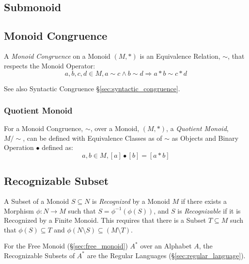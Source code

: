 \subsection{Submonoid}\label{sec:submonoid}

\subsection{Monoid Congruence}\label{sec:monoid_congruence}

A \emph{Monoid Congruence} on a Monoid $(M,*)$ is an Equivalence
Relation, $\sim$, that respects the Monoid Operator:
\[
  a,b,c,d \in M, a \sim c \wedge b \sim d \Rightarrow a*b \sim c*d
\]

See also Syntactic Congruence \S\ref{sec:syntactic_congruence}.



\subsubsection{Quotient Monoid}\label{sec:quotient_monoid}

For a Monoid Congruence, $\sim$, over a Monoid, $(M,*)$, a
\emph{Quotient Monoid}, $M/\sim$, can be defined with Equivalence
Classes as of $\sim$ as Objects and Binary Operation $\bullet$ defined
as:
\[
  a,b \in M, [a]\bullet[b] = [a*b]
\]



\subsection{Recognizable Subset}\label{sec:recognizable}

A Subset of a Monoid $S \subseteq N$ is \emph{Recognized} by a Monoid
$M$ if there exists a Morphism $\phi : N \rightarrow M$ such that $S =
\phi^{-1}(\phi(S))$, and $S$ is \emph{Recognizable} if it is
Recognized by a Finite Monoid. This requires that there is a Subset $T
\subseteq M$ such that $\phi(S) \subseteq T$ and $\phi(N \setminus S)
\subseteq (M \setminus T)$.

For the Free Monoid (\S\ref{sec:free_monoid}) $A^*$ over an Alphabet
$A$, the Recognizable Subsets of $A^*$ are the Regular Languages
(\S\ref{sec:regular_language}).



